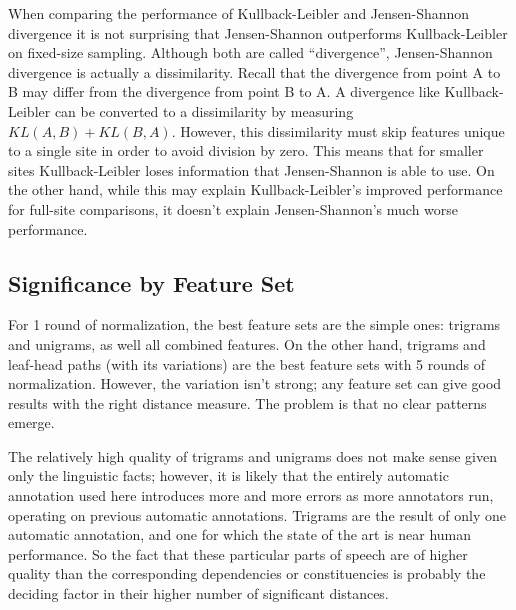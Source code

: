 When comparing the performance of Kullback-Leibler and Jensen-Shannon
divergence it is not surprising that Jensen-Shannon outperforms
Kullback-Leibler on fixed-size sampling. Although both are called
``divergence'', Jensen-Shannon divergence is actually a
dissimilarity. Recall that the divergence from point A to B may differ
from the divergence from point B to A. A divergence like
Kullback-Leibler can be converted to a dissimilarity by measuring
$KL(A,B) + KL(B,A)$. However, this dissimilarity must skip features
unique to a single site in order to avoid division by zero. This
means that for smaller sites Kullback-Leibler loses information that
Jensen-Shannon is able to use.  On the other hand, while this may
explain Kullback-Leibler's improved performance for full-site
comparisons, it doesn't explain Jensen-Shannon's much worse
performance.

\subsection{Significance by Feature Set}



For 1 round of normalization, the best feature sets are the simple
ones: trigrams and unigrams, as well all combined features. On the
other hand, trigrams and leaf-head paths (with its variations) are the
best feature sets with 5 rounds of normalization. However, the
variation isn't strong; any feature set can give good results with the
right distance measure. The problem is that no clear patterns emerge.

The relatively high quality of trigrams and unigrams does not make
sense given only the linguistic facts; however, it is likely that the
entirely automatic annotation used here introduces more and more
errors as more annotators run, operating on previous automatic
annotations. Trigrams are the result of only one automatic annotation,
and one for which the state of the art is near human performance. So
the fact that these particular parts of speech are of higher quality
than the corresponding dependencies or constituencies is probably the
deciding factor in their higher number of significant
distances.

